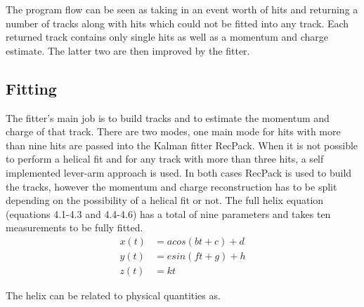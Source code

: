 The program flow can be seen as taking in an event worth of hits and returning a number of tracks along with hits which could not be fitted into any track. Each returned track contains only single hits as well as a momentum and charge estimate. The latter two are then improved by the fitter.


\subsection{Fitting}
The fitter's main job is to build tracks and to estimate the momentum and charge of that track. There are two modes, one main mode for hits with more than nine hits are passed into the Kalman fitter RecPack. When it is not possible to perform a helical fit and for any track with more than three hits, a self implemented lever-arm approach is used. In both cases RecPack is used to build the tracks, however the momentum and charge reconstruction has to be split depending on the possibility of a helical fit or not. The full helix equation (equations 4.1-4.3 and 4.4-4.6) has a total of nine parameters and takes ten measurements to be fully fitted.  
\begin{align}
x(t) &= acos(bt+c)+d\\
y(t) &= esin(ft+g) + h\\
z(t) &= kt
\end{align}

The helix can be related to physical quantities as.

